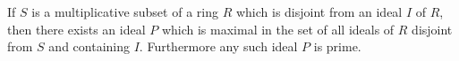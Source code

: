 If $S$ is a multiplicative subset of a ring $R$ which is disjoint from an ideal $I$ of $R$, then there exists an ideal $P$ which is maximal in the set of all ideals of $R$ disjoint from $S$ and containing $I$. Furthermore any such ideal $P$ is prime.
